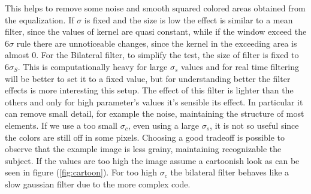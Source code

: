\documentclass[11pt,a4paper]{article}
\begin{document}
This helps to remove some noise and smooth squared colored areas obtained from the equalization.
If $\sigma$ is fixed and the size is low the effect is similar to a mean filter, since the values of kernel are quasi constant, while if the window exceed the 6$\sigma$ rule there are unnoticeable changes, since the kernel in the exceeding area is almost 0.\newline
For the Bilateral filter, to simplify the test, the size of filter is fixed to $6\sigma_{S}$. This is computationally heavy for large $\sigma_s$ values and for real time filtering will be better to set it to a fixed value, but for understanding better the filter effects is more interesting this setup.
The effect of this filter is lighter than the others and only for high parameter's values it's sensible its effect.
In particular it can remove small detail, for example the noise, maintaining the structure of most elements.
If we use a too small $\sigma_c$, even using a large $\sigma_s$, it is not so useful since the colors are still off in some pixels.
Choosing a good tradeoff is possible to observe that the example image is less grainy, maintaining recognizable the subject.
If the values are too high the image assume a cartoonish look as can be seen in figure (\ref{fig:cartoon}). For too high $\sigma_c$ the bilateral filter behaves like a slow gaussian filter due to the more complex code.
\end{document}
